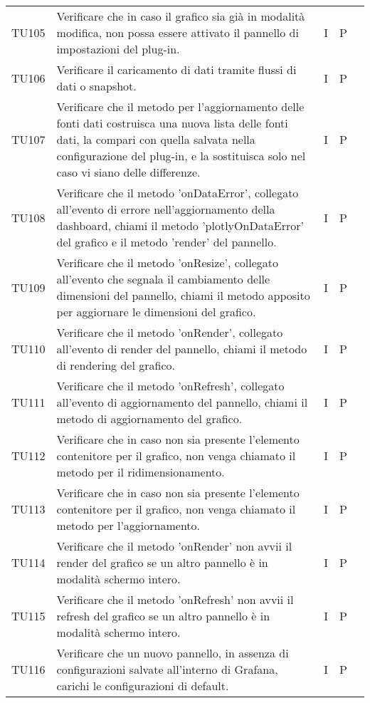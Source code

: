 \begin{longtable} {
		>{}p{15mm} 
		>{}p{79.5mm}
		>{}p{15mm} 
		>{}p{15mm}
		>{}p{0mm}}
	TU105		& Verificare che in caso il grafico sia già in modalità modifica, non possa essere attivato il pannello di impostazioni del plug-in.& I & P &\TBstrut \\ [2mm]
	TU106		& Verificare il caricamento di dati tramite flussi di dati o snapshot.& I & P &\TBstrut \\ [2mm]
	TU107		& Verificare che il metodo per l'aggiornamento delle fonti dati costruisca una nuova lista delle fonti dati, la compari con quella salvata nella configurazione del plug-in, e la sostituisca solo nel caso vi siano delle differenze. & I & P &\TBstrut \\ [2mm]
	TU108		& Verificare che il metodo 'onDataError', collegato all'evento di errore nell'aggiornamento della dashboard, chiami il metodo 'plotlyOnDataError' del grafico e il metodo 'render' del pannello.& I & P &\TBstrut \\ [2mm]
	TU109		& Verificare che il metodo 'onResize', collegato all'evento che segnala il cambiamento delle dimensioni del pannello, chiami il metodo apposito per aggiornare le dimensioni del grafico.& I & P &\TBstrut \\ [2mm]
	TU110		& Verificare che il metodo 'onRender', collegato all'evento di render del pannello, chiami il metodo di rendering del grafico.& I & P &\TBstrut \\ [2mm]
	TU111		& Verificare che il metodo 'onRefresh', collegato all'evento di aggiornamento del pannello, chiami il metodo di aggiornamento del grafico.& I & P &\TBstrut \\ [2mm]
	TU112		& Verificare che in caso non sia presente l'elemento contenitore per il grafico, non venga chiamato il metodo per il ridimensionamento.& I & P &\TBstrut \\ [2mm]
	TU113		& Verificare che in caso non sia presente l'elemento contenitore per il grafico, non venga chiamato il metodo per l'aggiornamento.& I & P &\TBstrut \\ [2mm]
	TU114		& Verificare che il metodo 'onRender' non avvii il render del grafico se un altro pannello è in modalità schermo intero.& I & P &\TBstrut \\ [2mm]
	TU115		& Verificare che il metodo 'onRefresh' non avvii il refresh del grafico se un altro pannello è in modalità schermo intero.& I & P &\TBstrut \\ [2mm]
	TU116		& Verificare che un nuovo pannello, in assenza di configurazioni salvate all'interno di Grafana, carichi le configurazioni di default.& I & P &\TBstrut \\ [2mm]

\end{longtable}

